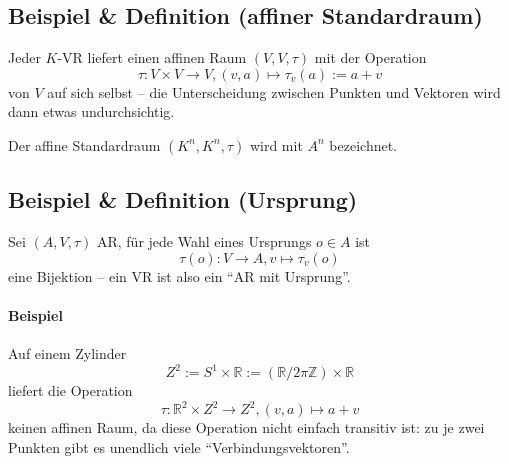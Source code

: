 \subsection{Beispiel \& Definition (affiner Standardraum)}
	\begin{Definition}
		Jeder $ K $-VR liefert einen affinen Raum $ (V,V,\tau) $ mit der Operation
		\[ \tau: V\times V\to V, (v,a)\mapsto \tau_v(a):= a+v \]
	von $ V $ auf sich selbst -- die Unterscheidung zwischen Punkten und Vektoren wird dann etwas undurchsichtig.
	
	Der affine Standardraum $ (K^n,K^n,\tau) $ wird mit $ A^n $ bezeichnet.
	\end{Definition}
	
\subsection{Beispiel \& Definition (Ursprung)}
	\begin{Definition}[Ursprung]
		Sei $ (A,V,\tau) $ AR, für jede Wahl eines Ursprungs $ o\in A $ ist
		\[ \tau(o) :V\to A,v\mapsto \tau_v(o) \]
	eine Bijektion -- ein VR ist also ein "`AR mit Ursprung"'.
	\end{Definition}
	
\paragraph{Beispiel}
	Auf einem Zylinder
	\[ Z^2 := S^1\times \mathbb{R}:= (\mathbb{R}/2\pi\mathbb{Z})\times \mathbb{R} \]
	liefert die Operation
		\[ \tau:\mathbb{R}^2\times Z^2\to Z^2,(v,a)\mapsto a+v \]
	keinen affinen Raum, da diese Operation nicht einfach transitiv ist: zu je zwei Punkten gibt es unendlich viele "`Verbindungsvektoren"'.


